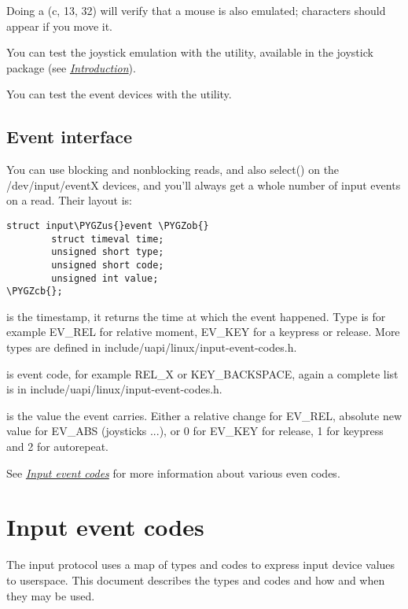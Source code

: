 \documentclass[a4paper,8pt,english]{sphinxmanual}
\def\PYGZus{\char`\_}
\def\PYGZob{\char`\{}
\def\PYGZcb{\char`\}}
\begin{document}
Doing a  (c, 13, 32) will verify that a mouse
is also emulated; characters should appear if you move it.

You can test the joystick emulation with the  utility,
available in the joystick package (see {\hyperref[input/joydev/joystick:joystick\string-doc]{\emph{Introduction}}}).

You can test the event devices with the  utility.


\subsection{Event interface}
\label{input/input:event-interface}\label{input/input:id3}
You can use blocking and nonblocking reads, and also select() on the
/dev/input/eventX devices, and you'll always get a whole number of input
events on a read. Their layout is:

\begin{Verbatim}[commandchars=\\\{\}]
struct input\PYGZus{}event \PYGZob{}
        struct timeval time;
        unsigned short type;
        unsigned short code;
        unsigned int value;
\PYGZcb{};
\end{Verbatim}

 is the timestamp, it returns the time at which the event happened.
Type is for example EV\_REL for relative moment, EV\_KEY for a keypress or
release. More types are defined in include/uapi/linux/input-event-codes.h.

 is event code, for example REL\_X or KEY\_BACKSPACE, again a complete
list is in include/uapi/linux/input-event-codes.h.

 is the value the event carries. Either a relative change for
EV\_REL, absolute new value for EV\_ABS (joysticks ...), or 0 for EV\_KEY for
release, 1 for keypress and 2 for autorepeat.

See {\hyperref[input/event\string-codes:input\string-event\string-codes]{\emph{Input event codes}}} for more information about various even codes.


\section{Input event codes}
\label{input/event-codes:input-event-codes}\label{input/event-codes::doc}\label{input/event-codes:id1}
The input protocol uses a map of types and codes to express input device values
to userspace. This document describes the types and codes and how and when they
may be used.
\end{document}
